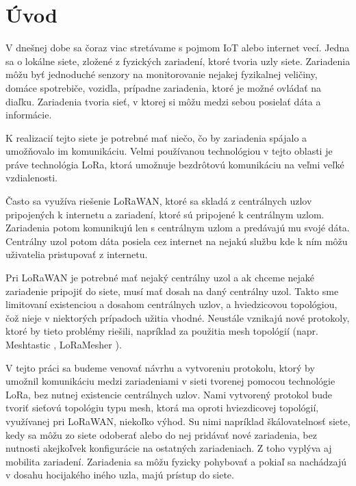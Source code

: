 \documentclass[slovak,master]{diploma}
\begin{document}
\MakeTitlePages

\listoffigures
\clearpage

\listoftables
\clearpage

\chapter{Úvod}
V dnešnej dobe sa čoraz viac stretávame s pojmom IoT alebo internet vecí. Jedna sa o lokálne siete, zložené z fyzických zariadení, ktoré tvoria uzly siete.
Zariadenia môžu byť jednoduché senzory na monitorovanie nejakej fyzikalnej veličiny, domáce spotrebiče, vozidla, prípadne 
zariadenia, ktoré je možné ovládať na diaľku. Zariadenia tvoria sieť, v ktorej si môžu medzi sebou posielať 
dáta a informácie.

K realizacií tejto siete je potrebné mať niečo, čo by zariadenia spájalo a umožňovalo im komunikáciu. Velmi používanou technológiou
v tejto oblasti je práve technológia LoRa, ktorá umožnuje bezdrôtovú komunikáciu na veľmi veľké vzdialenosti.

Často sa využíva riešenie LoRaWAN, ktoré sa skladá z centrálnych uzlov pripojených k internetu a zariadení, ktoré sú pripojené k centrálnym uzlom. 
Zariadenia potom komunikujú len s centrálnym uzlom a predávajú mu svojé dáta. Centrálny uzol potom dáta posiela cez internet na nejakú službu kde 
k ním môžu uživatelia pristupovať z internetu.

Pri LoRaWAN je potrebné mať nejaký centrálny uzol a ak chceme nejaké zariadenie pripojiť do siete, musí mať dosah na daný centrálny uzol. 
Takto sme limitovaní existenciou a dosahom centrálnych uzlov, a hviedzicovou topológiou, čož nieje v niektorých prípadoch užitia vhodné. Neustále vznikajú nové 
protokoly, ktoré by tieto problémy riešili, napríklad za použitia mesh topológií (napr. Meshtastic \cite{meshtastic}, LoRaMesher \cite{loramesher}).

V tejto práci sa budeme venovať návrhu a vytvoreniu protokolu, ktorý by umožnil komunikáciu medzi zariadeniami v sieti tvorenej pomocou technológie LoRa,
bez nutnej existencie centrálnych uzlov. Nami vytvorený protokol bude tvoriť sieťovú topológiu typu mesh, ktorá ma oproti hviezdicovej topológií, 
využívanej pri LoRaWAN, niekoľko výhod. Su nimi napríklad škálovatelnosť siete, kedy sa môžu zo siete odoberať alebo do nej pridávať nové zariadenia, 
bez nutnosti akejkoľvek konfigurácie na ostatných zariadeniach. Z toho vyplýva aj mobilita zariadení. Zariadenia sa môžu fyzicky pohybovať a 
pokiaľ sa nachádzajú v dosahu hocijakého iného uzla, majú prístup do siete.
\end{document}
